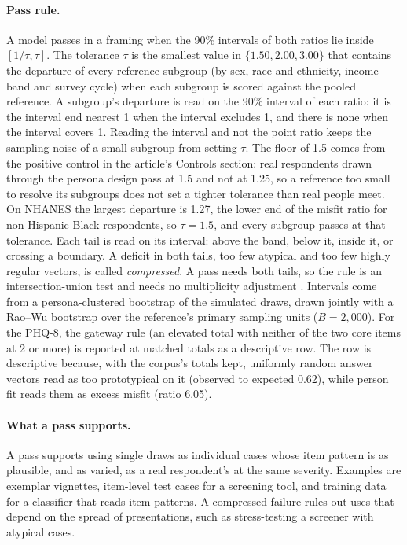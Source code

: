 \paragraph{Pass rule.}
A model passes in a framing when the 90\% intervals of both ratios lie inside $[1/\tau, \tau]$.
The tolerance $\tau$ is the smallest value in $\{1.50, 2.00, 3.00\}$ that contains the departure of every reference subgroup (by sex, race and ethnicity, income band and survey cycle) when each subgroup is scored against the pooled reference.
A subgroup's departure is read on the 90\% interval of each ratio: it is the interval end nearest 1 when the interval excludes 1, and there is none when the interval covers 1.
Reading the interval and not the point ratio keeps the sampling noise of a small subgroup from setting $\tau$.
The floor of 1.5 comes from the positive control in the article's Controls section: real respondents drawn through the persona design pass at 1.5 and not at 1.25, so a reference too small to resolve its subgroups does not set a tighter tolerance than real people meet.
On NHANES the largest departure is 1.27, the lower end of the misfit ratio for non-Hispanic Black respondents, so $\tau = 1.5$, and every subgroup passes at that tolerance. %
Each tail is read on its interval: above the band, below it, inside it, or crossing a boundary.
A deficit in both tails, too few atypical and too few highly regular vectors, is called \emph{compressed}.
A pass needs both tails, so the rule is an intersection-union test and needs no multiplicity adjustment \citep{berger1982iut}.
Intervals come from a persona-clustered bootstrap of the simulated draws, drawn jointly with a Rao--Wu bootstrap over the reference's primary sampling units \citep{raowu1988resampling,raowuyue1992resampling} ($B = 2{,}000$).
For the PHQ-8, the gateway rule (an elevated total with neither of the two core items at 2 or more) is reported at matched totals as a descriptive row.
The row is descriptive because, with the corpus's totals kept, uniformly random answer vectors read as too prototypical on it (observed to expected 0.62), while person fit reads them as excess misfit (ratio 6.05). %

\paragraph{What a pass supports.}
A pass supports using single draws as individual cases whose item pattern is as plausible, and as varied, as a real respondent's at the same severity.
Examples are exemplar vignettes, item-level test cases for a screening tool, and training data for a classifier that reads item patterns.
A compressed failure rules out uses that depend on the spread of presentations, such as stress-testing a screener with atypical cases.

